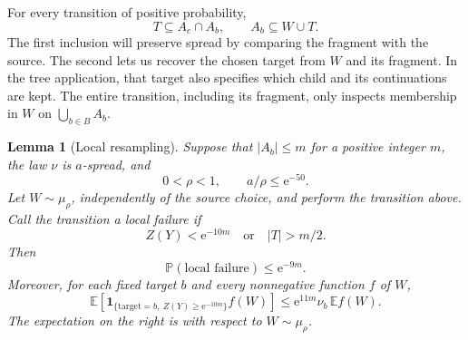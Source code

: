 \documentclass[11pt]{article}
\newtheorem{lemma}[theorem]{Lemma}
\numberwithin{equation}{section}
\newcommand{\PP}{\mathbb P}
\newcommand{\EE}{\mathbb E}
\newcommand{\ind}{\mathbf 1}
\newcommand{\ee}{\mathrm e}
\begin{document}
For every transition of positive probability,
\begin{equation}\label{eq:two-inclusions}
 T\subseteq A_c\cap A_b,
 \qquad A_b\subseteq W\cup T.
\end{equation}
The first inclusion will preserve spread by comparing the fragment
with the source. The second lets us recover the chosen target from
$W$ and its fragment. In the tree application, that target also
specifies which child and its continuations are kept.
The entire transition, including its fragment, only inspects
membership in $W$ on $\bigcup_{b\in B}A_b$.

\begin{lemma}[Local resampling]\label{lem:local}
Suppose that $|A_b|\le m$ for a positive integer $m$, the law $\nu$
is $a$-spread, and
\[
 0<\rho<1,\qquad a/\rho\le\ee^{-50}.
\]
Let $W\sim\mu_\rho$, independently of the source choice, and perform
the transition above. Call the transition a \emph{local failure} if
\[
 Z(Y)<\ee^{-10m}\quad\text{or}\quad |T|>m/2.
\]
Then
\begin{equation}\label{eq:local-failure}
 \PP(\text{local failure})\le\ee^{-9m}.
\end{equation}
Moreover, for each fixed target $b$ and every nonnegative function
$f$ of $W$,
\begin{equation}\label{eq:distortion}
 \EE\!\left[
  \ind_{\{\mathrm{target}=b,\ Z(Y)\ge\ee^{-10m}\}} f(W)
 \right]
 \le \ee^{11m}\nu_b\,\EE f(W).
\end{equation}
The expectation on the right is with respect to $W\sim\mu_\rho$.
\end{lemma}
\end{document}
